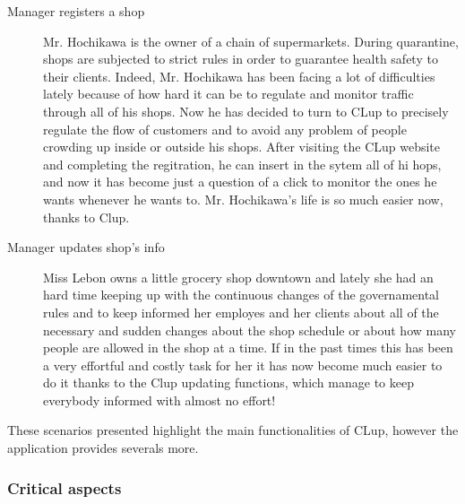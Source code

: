 \begin{description}
    \item[Manager registers a shop]
    Mr. Hochikawa is the owner of a chain of supermarkets.
    During quarantine, shops are subjected to strict rules in order to guarantee health safety to their clients. Indeed, Mr. Hochikawa has been facing a lot of difficulties lately because of how hard it can be to regulate and monitor traffic through all of his shops. Now he has decided to turn to CLup to precisely regulate the flow of customers and to avoid any problem of people crowding up inside or outside his shops. After visiting the CLup website and completing the regitration, he can insert in the sytem all of hi hops, and now it has become just a question of a click to monitor the ones he wants whenever he wants to. Mr. Hochikawa’s life is so much easier now, thanks to Clup.

    \item[Manager updates shop's info]
    Miss Lebon owns a little grocery shop downtown and lately she had an hard time keeping up with the continuous changes of the governamental rules and to keep informed her employes and her clients about all of the necessary and sudden changes about the shop schedule or about how many people are allowed in the shop at a time. If in the past times this has been a very effortful and costly task for her it has now become much easier to do it thanks to the Clup updating functions, which manage to keep everybody informed with almost no effort! 
\end{description}

These scenarios presented highlight the main functionalities of CLup, however the application provides severals more. 

\subsubsection{Critical aspects}
\label{subsubsect:criticalaspects}

